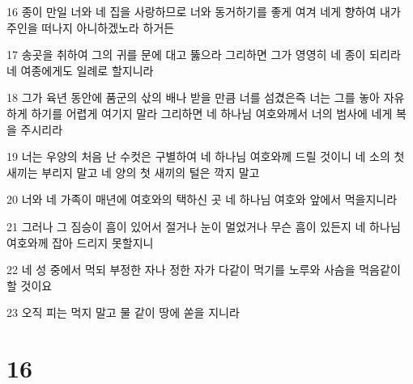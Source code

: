 \par 16 종이 만일 너와 네 집을 사랑하므로 너와 동거하기를 좋게 여겨 네게 향하여 내가 주인을 떠나지 아니하겠노라 하거든
\par 17 송곳을 취하여 그의 귀를 문에 대고 뚫으라 그리하면 그가 영영히 네 종이 되리라 네 여종에게도 일례로 할지니라
\par 18 그가 육년 동안에 품군의 삯의 배나 받을 만큼 너를 섬겼은즉 너는 그를 놓아 자유하게 하기를 어렵게 여기지 말라 그리하면 네 하나님 여호와께서 너의 범사에 네게 복을 주시리라
\par 19 너는 우양의 처음 난 수컷은 구별하여 네 하나님 여호와께 드릴 것이니 네 소의 첫 새끼는 부리지 말고 네 양의 첫 새끼의 털은 깍지 말고
\par 20 너와 네 가족이 매년에 여호와의 택하신 곳 네 하나님 여호와 앞에서 먹을지니라
\par 21 그러나 그 짐승이 흠이 있어서 절거나 눈이 멀었거나 무슨 흠이 있든지 네 하나님 여호와께 잡아 드리지 못할지니
\par 22 네 성 중에서 먹되 부정한 자나 정한 자가 다같이 먹기를 노루와 사슴을 먹음같이 할 것이요
\par 23 오직 피는 먹지 말고 물 같이 땅에 쏟을 지니라

\chapter{16}


